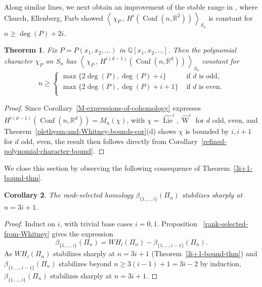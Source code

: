 \documentclass[12pt]{amsart}
\theoremstyle{plain}
\newtheorem{thm}{Theorem}[section]
\newtheorem{cor}[thm]{Corollary}
\theoremstyle{definition}
\begin{document}
Along similar lines, we next obtain an improvement
of the stable range in \cite[Theorem 1]{CEF2}, where Church, Ellenberg, Farb
showed $
\left\langle 
\,
\chi_P \, , \, H^{i}({{\operatorname{Conf}}}(n,{{\mathbb{R}}}^2))
\,
\right\rangle_{S_n}
$
is constant for  $n \geq  \deg(P)+2i$.

\begin{thm}
\label{improved-stable-range-thm}
Fix $P=P(x_1,x_2,\ldots)$ in ${{\mathbb Q}}[x_1,x_2,\ldots]$.  
Then 
the polynomial character
$\chi_P$ on $S_n$ has
$
\left\langle 
\,
\chi_P \, , \, H^{i(d-1)}({{\operatorname{Conf}}}(n,{{\mathbb{R}}}^d))
\,
\right\rangle_{S_n}
$
constant for 
$$
n \geq 
\begin{cases} 
 \max\{ 2 \deg(P), \deg(P)+i\} & \text{ if }d\text{ is odd},\\
 \max\{ 2 \deg(P), \deg(P)+i+1\} & \text{ if }d\text{ is even}.\\
\end{cases}
$$
\end{thm}

\begin{proof}
Since Corollary~\ref{M-expressions-of-cohomology}
expresses $H^{i(d-1)}({{\operatorname{Conf}}}(n,{{\mathbb{R}}}^d))=M_n(\chi)$,
with $\chi= \widehat{{\operatorname{Lie}}}^i, \widehat{{\operatorname{W}}}^i$ for $d$ odd, even,
and Theorem~\ref{plethysm-and-Whitney-bounds-cor}(d)
shows $\chi$ is bounded by $i, i+1$ for $d$ odd, even,
the result then follows directly
from Corollary~\ref{refined-polynomial-character-bound}.
\end{proof}

We close this section by observing the following consequence of
Theorem~\ref{3i+1-bound-thm}. 

\begin{cor}
\label{initial-segement-beta-stab}
The rank-selected homology $\beta_{\{ 1,\dots ,i\} } (\Pi_n)$ 
stabilizes sharply at $n= 3i+1$.
\end{cor}
 
 \begin{proof}
Induct on $i$, with trivial base cases $i=0,1$.
Proposition ~\ref{rank-selected-from-Whitney} gives the expression
$$
\beta_{\{ 1,\dots ,i\} } (\Pi_n)
= WH_i(\Pi_n) - \beta_{\{ 1,\dots ,i-1\} } (\Pi_n).
$$
As $WH_i(\Pi_n)$ stabilizes sharply at 
$n= 3i+1$ (Theorem~\ref{3i+1-bound-thm}) and
$\beta_{\{ 1,\dots ,i-1\} } (\Pi_n)$
stabilizes beyond $n \geq 3(i-1)+1=3i-2$ by induction, 
$\beta_{\{ 1,\dots ,i\} } (\Pi_n)$ stabilizes
sharply at $n=3i+1$.
\end{proof}
\end{document}
